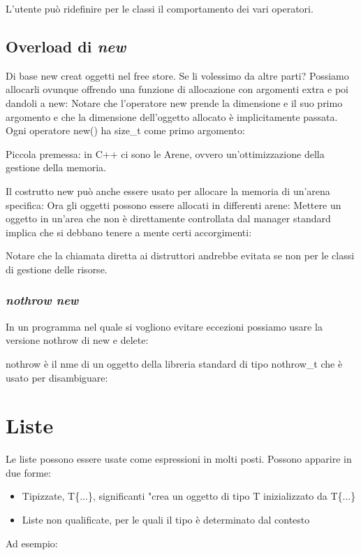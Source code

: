 \documentclass[11pt,a4paper]{book}
\begin{document}
L'utente può ridefinire per le classi il comportamento dei vari operatori.

\subsection{Overload di \emph{new}}
Di base new creat oggetti nel free store. Se li volessimo da altre parti? Possiamo allocarli ovunque offrendo una funzione di allocazione con argomenti extra e poi dandoli a new:
\label{code: 161}
Notare che l'operatore new prende la dimensione e il suo primo argomento e che la dimensione dell'oggetto allocato è implicitamente passata. Ogni operatore new() ha size\_t come primo argomento:
\label{code: 162}

Piccola premessa: in C++ ci sono le Arene, ovvero  un'ottimizzazione della gestione della memoria.

Il costrutto new può anche essere usato per allocare la memoria di un'arena specifica:
\label{code: 163}
Ora gli oggetti possono essere allocati in differenti arene:
\label{code: 164}
Mettere un oggetto in un'area che non è direttamente controllata dal manager standard implica che si debbano tenere a mente certi accorgimenti:
\label{code: 165}

Notare che la chiamata diretta ai distruttori andrebbe evitata se non per le classi di gestione delle risorse.

\subsubsection{\emph{nothrow new}}
In un programma nel quale si vogliono evitare eccezioni possiamo usare la versione nothrow di new e delete:
\label{code: 166}

nothrow è il nme di un oggetto della libreria standard di tipo nothrow\_t che è usato per disambiguare:
\label{code: 167}

\section{Liste}
Le liste possono essere usate come espressioni in molti posti. Possono apparire in due forme:
\begin{itemize}
	\item Tipizzate, T\{...\}, significanti "crea un oggetto di tipo T inizializzato da T\{...\}
	\item Liste non qualificate, per le quali il tipo è determinato dal contesto  
\end{itemize}
Ad esempio:
\label{code: 168}
\end{document}
